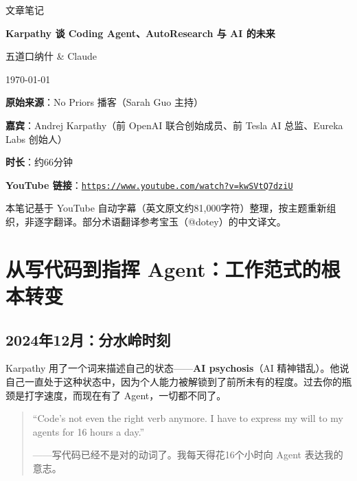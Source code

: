 \documentclass[a4paper]{article}
\newcommand{\notetitle}{Karpathy 谈 Coding Agent、AutoResearch 与 AI 的未来}
\newcommand{\noteauthors}{五道口纳什 \& Claude}
\newcommand{\notedate}{\today}
\newcommand{\videoduration}{约66分钟}
\newcommand{\videourl}{https://www.youtube.com/watch?v=kwSVtQ7dziU}
\begin{document}
\begin{titlepage}
\centering
{\Large 文章笔记\par}
\vspace{1.2cm}
{\huge\bfseries \notetitle\par}
\vspace{0.8cm}
{\large \noteauthors\par}
\vspace{0.3cm}
{\large \notedate\par}
\vspace{1.5cm}

\vfill
\begin{tcolorbox}[width=0.9\textwidth, colback=black!2!white, colframe=black!60, sharp corners]
\textbf{原始来源}：No Priors 播客（Sarah Guo 主持）\par
\textbf{嘉宾}：Andrej Karpathy（前 OpenAI 联合创始成员、前 Tesla AI 总监、Eureka Labs 创始人）\par
\textbf{时长}：\videoduration\par
\textbf{YouTube 链接}：\href{\videourl}{\nolinkurl{\videourl}}\par
\vspace{0.3cm}
{\small 本笔记基于 YouTube 自动字幕（英文原文约81,000字符）整理，按主题重新组织，非逐字翻译。部分术语翻译参考宝玉（@dotey）的中文译文。}
\end{tcolorbox}
\end{titlepage}

\tableofcontents
\newpage


\section{从写代码到指挥 Agent：工作范式的根本转变}

\subsection{2024年12月：分水岭时刻}

Karpathy 用了一个词来描述自己的状态——\textbf{AI psychosis}（AI 精神错乱）。他说自己一直处于这种状态中，因为个人能力被解锁到了前所未有的程度。过去你的瓶颈是打字速度，而现在有了 Agent，一切都不同了。

\begin{quote}
``Code's not even the right verb anymore. I have to express my will to my agents for 16 hours a day.''

——写代码已经不是对的动词了。我每天得花16个小时向 Agent 表达我的意志。
\end{quote}
\end{document}
